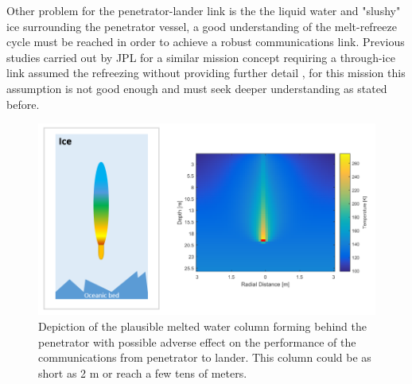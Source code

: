 Other problem for the penetrator-lander link is the the liquid water and "slushy" ice surrounding the penetrator vessel, a good understanding of the melt-refreeze cycle must be reached in order to achieve a robust communications link. Previous studies carried out by JPL for a similar mission concept requiring a through-ice link assumed the refreezing without providing further detail \cite{iceLink-scott}, for this mission this assumption is not good enough and must seek deeper understanding as stated before. 

\begin{figure}[htb]
	\centering
	\includegraphics[width=\textwidth]{figures/comms/meltColCycle_0}
	\caption{Depiction of the plausible melted water column forming behind the penetrator with possible adverse effect on the performance of the communications from penetrator to lander. This column could be as short as 2 m or reach a few tens of meters.}
	\label{fig:meltColumn_broad}
\end{figure}
